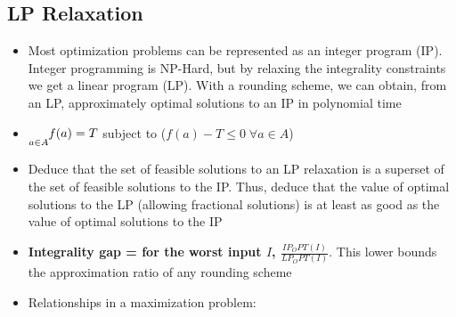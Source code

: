 \documentclass[20pt,a4paper,landscape]{extarticle}
\let\max\relax
\DeclareMathOperator*{\max}{max\:}
\let\min\relax
\DeclareMathOperator*{\min}{min\:}
\begin{document}
\begin{flushleft}
\subsection{LP Relaxation}
\begin{itemize}
\item Most optimization problems can be represented as an integer program (IP). Integer programming is NP-Hard, but by relaxing the integrality constraints we get a linear program (LP). With a rounding scheme, we can obtain, from an LP, approximately optimal solutions to an IP in polynomial time
\item $\min\underset{a \in A}{\max}f(a) = \min T$ subject to ($f(a) - T \leq 0 \; \forall a \in A$)
\item Deduce that the set of feasible solutions to an LP relaxation is a superset of the set of feasible solutions to the IP. Thus, deduce that the value of optimal solutions to the LP (allowing fractional solutions) is at least as good as the value of optimal solutions to the IP
\item \textbf{Integrality gap = for the worst input $I$, $\frac{IP_OPT(I)}{LP_OPT(I)}$}. This lower bounds the approximation ratio of any rounding scheme
\item Relationships in a maximization problem:
\end{itemize}
\clearpage

\end{flushleft}
\end{document}
